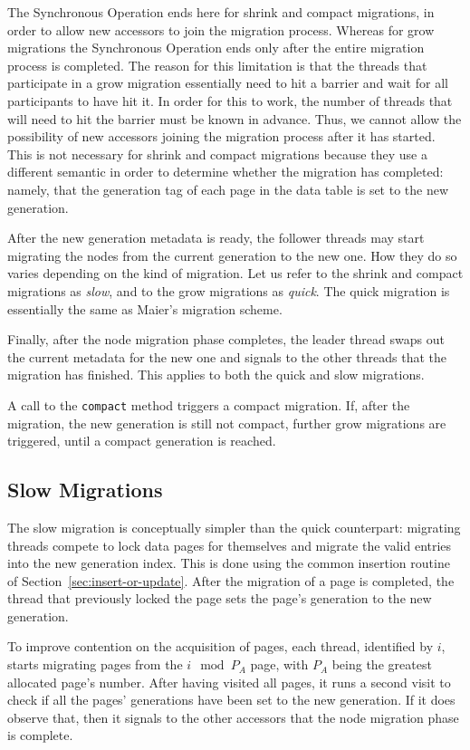 The Synchronous Operation ends here for shrink and compact migrations, in order to allow new accessors to join the migration process.
Whereas for grow migrations the Synchronous Operation ends only after the entire migration process is completed.
The reason for this limitation is that the threads that participate in a grow migration essentially need to hit a barrier and wait for all participants to have hit it.
In order for this to work, the number of threads that will need to hit the barrier must be known in advance.
Thus, we cannot allow the possibility of new accessors joining the migration process after it has started.
This is not necessary for shrink and compact migrations because they use a different semantic in order to determine whether the migration has completed: namely, that the generation tag of each page in the data table is set to the new generation.

After the new generation metadata is ready, the follower threads may start migrating the nodes from the current generation to the new one.
How they do so varies depending on the kind of migration.
Let us refer to the shrink and compact migrations as \emph{slow}, and to the grow migrations as \emph{quick}.
The quick migration is essentially the same as Maier's migration scheme.

Finally, after the node migration phase completes, the leader thread swaps out the current metadata for the new one and signals to the other threads that the migration has finished.
This applies to both the quick and slow migrations.

A call to the \texttt{compact} method triggers a compact migration.
If, after the migration, the new generation is still not compact, further grow migrations are triggered, until a compact generation is reached.

\subsection{Slow Migrations}\label{subsec:slow-migrations}

The slow migration is conceptually simpler than the quick counterpart: migrating threads compete to lock data pages for themselves and migrate the valid entries into the new generation index.
This is done using the common insertion routine of Section~\ref{sec:insert-or-update}.
After the migration of a page is completed, the thread that previously locked the page sets the page's generation to the new generation.

To improve contention on the acquisition of pages, each thread, identified by $i$, starts migrating pages from the $i \mod P_A$ page, with $P_A$ being the greatest allocated page's number.
After having visited all pages, it runs a second visit to check if all the pages' generations have been set to the new generation.
If it does observe that, then it signals to the other accessors that the node migration phase is complete.

